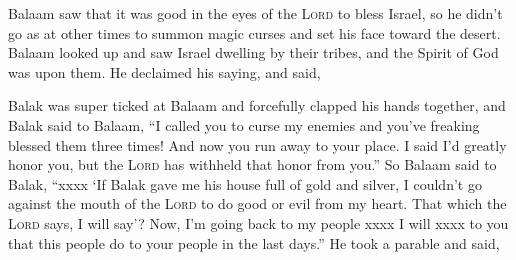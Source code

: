 
\begin{inparaenum}
     Balaam saw that it was good in the eyes of the \textsc{Lord} to bless Israel, so he didn't go as at other times to summon magic curses and set his face toward the desert.%
     Balaam looked up and saw Israel dwelling by their tribes, and the Spirit of God was upon them.%
     He declaimed his saying, and said,%
    
    
    
    \pvbb{}{}%
    
    
    
    \pvbb{}{}%
    
    
    \pvbb{}{}%
    
    
    \pvcc{}{}{}%
    
    
    \pvbb{}{}%
    
     Balak was super ticked at Balaam and forcefully clapped his hands together, and Balak said to Balaam, ``I called you to curse my enemies and you've freaking blessed them three times!%
     And now you run away to your place. I said I'd greatly honor you, but the \textsc{Lord} has withheld that honor from you.''%
     So Balaam said to Balak, ``xxxx%
     `If Balak gave me his house full of gold and silver, I couldn't go against the mouth of the \textsc{Lord} to do good or evil from my heart. That which the \textsc{Lord} says, I will say'?%
     Now, I'm going back to my people xxxx I will xxxx to you that this people do to your people in the last days.''%
     He took a parable and said,%
    

\end{inparaenum}
